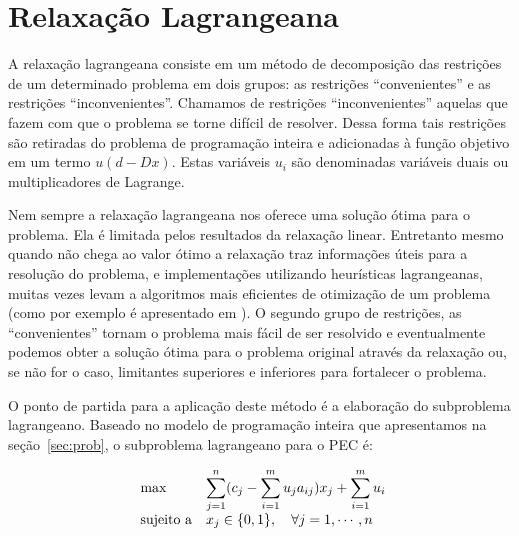 \documentclass{article}
\begin{document}
	
	\section{Relaxação Lagrangeana}\label{sec:relag}
	A relaxação lagrangeana consiste em um método de decomposição das restrições de um determinado problema em dois grupos: as restrições \enquote{convenientes} e as restrições \enquote{inconvenientes}. 
	Chamamos de restrições \enquote{inconvenientes} aquelas que fazem com que o problema se torne difícil de resolver. Dessa forma tais restrições são
	retiradas do problema de programação inteira e adicionadas à função objetivo em um termo $u(d - Dx)$. Estas variáveis $u_i$ são denominadas variáveis duais ou multiplicadores de Lagrange.
	
	Nem sempre a relaxação lagrangeana nos oferece uma solução ótima para o problema. Ela é limitada pelos resultados da relaxação linear. Entretanto mesmo quando não chega ao valor ótimo a relaxação traz informações úteis para a resolução do problema, e implementações utilizando heurísticas lagrangeanas, muitas vezes levam a algoritmos mais eficientes de otimização de um problema (como por exemplo é apresentado em \cite{guo2005using}). 
	O segundo grupo de restrições, as \enquote{convenientes} tornam o problema mais fácil de ser resolvido e eventualmente podemos obter a solução ótima para o problema original através da relaxação ou, se não for o caso, limitantes superiores e inferiores para fortalecer o problema. 
	
	O ponto de partida para a aplicação deste método é a elaboração do subproblema lagrangeano. Baseado no modelo de programação inteira que apresentamos na seção~\ref{sec:prob}, o subproblema lagrangeano para o PEC é: 
	
	\begin{equation*}
        \begin{array}{ll@{}ll}
            \text{max}  & \displaystyle\sum\limits_{j=1}^n (c_{j} - \displaystyle\sum\limits_{i=1}^m u_{j} a_{ij})x_j+  \displaystyle\sum\limits_{i=1}^m u_{i}\\
            \text{sujeito a}
                 &                                                x_{j} \in \{0,1\}, \quad \forall j = 1, \cdots, n
        \end{array}
    \end{equation*}
	
	
\end{document}
